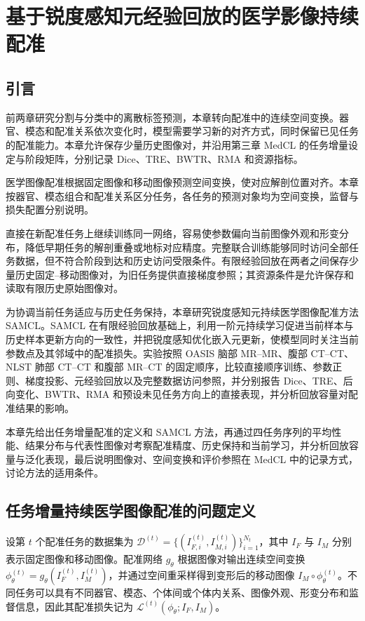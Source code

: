 \chapter{基于锐度感知元经验回放的医学影像持续配准}
\label{chap:registration}
\setlength{\emergencystretch}{1em}

\section{引言}
\label{sec:registration-introduction}

前两章研究分割与分类中的离散标签预测，本章转向配准中的连续空间变换。器官、模态和配准关系依次变化时，模型需要学习新的对齐方式，同时保留已见任务的配准能力。本章允许保存少量历史图像对，并沿用第三章 MedCL 的任务增量设定与阶段矩阵，分别记录 Dice、TRE、BWTR、RMA 和资源指标。

医学图像配准根据固定图像和移动图像预测空间变换，使对应解剖位置对齐。本章按器官、模态组合和配准关系区分任务，各任务的预测对象均为空间变换，监督与损失配置分别说明。

直接在新配准任务上继续训练同一网络，容易使参数偏向当前图像外观和形变分布，降低早期任务的解剖重叠或地标对应精度。完整联合训练能够同时访问全部任务数据，但不符合阶段到达和历史访问受限条件。有限经验回放在两者之间保存少量历史固定--移动图像对，为旧任务提供直接梯度参照；其资源条件是允许保存和读取有限历史原始图像对。

为协调当前任务适应与历史任务保持，本章研究锐度感知元持续医学图像配准方法 SAMCL\cite{wang2024samcl}。SAMCL 在有限经验回放基础上，利用一阶元持续学习促进当前样本与历史样本更新方向的一致性，并把锐度感知优化嵌入元更新，使模型同时关注当前参数点及其邻域中的配准损失。实验按照 OASIS 脑部 MR--MR、腹部 CT--CT、NLST 肺部 CT--CT 和腹部 MR--CT 的固定顺序，比较直接顺序训练、参数正则、梯度投影、元经验回放以及完整数据访问参照，并分别报告 Dice、TRE、后向变化、BWTR、RMA 和预设未见任务方向上的直接表现，并分析回放容量对配准结果的影响。

本章先给出任务增量配准的定义和 SAMCL 方法，再通过四任务序列的平均性能、结果分布与代表性图像对考察配准精度、历史保持和当前学习，并分析回放容量与泛化表现，最后说明图像对、空间变换和评价参照在 MedCL 中的记录方式，讨论方法的适用条件。

\section{任务增量持续医学图像配准的问题定义}
\label{sec:registration-formulation}

设第 $t$ 个配准任务的数据集为
$\mathcal{D}^{(t)}=\{(I_{F,i}^{(t)},I_{M,i}^{(t)})\}_{i=1}^{N_t}$，其中 $I_F$ 与 $I_M$ 分别表示固定图像和移动图像。配准网络
$g_{\theta}$ 根据图像对输出连续空间变换
$\phi_{\theta}^{(t)}=g_{\theta}(I_F^{(t)},I_M^{(t)})$，并通过空间重采样得到变形后的移动图像 $I_M\circ\phi_{\theta}^{(t)}$。不同任务可以具有不同器官、模态、个体间或个体内关系、图像外观、形变分布和监督信息，因此其配准损失记为
$\mathcal{L}^{(t)}(\phi_{\theta};I_F,I_M)$。

